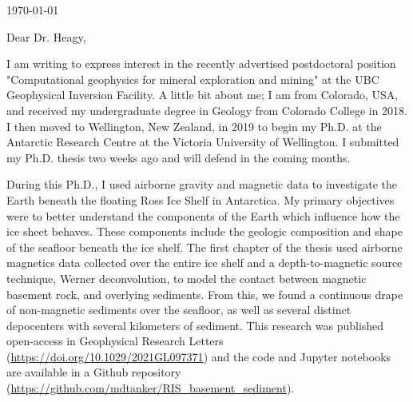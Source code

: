 \documentclass{ExpressiveCoverLetter}
\begin{document}
\coverletterheader[
    firstname=Matthew,
    middleinitial=D,
    lastname=Tankersley,
    email=matt.d.tankersley@gmail.com,
    linkedin=matthew-tankersley,
    github=mdtanker,
]

\vspace{0.25in}
\today
\vspace{0.15in}


Dear Dr. Heagy,

I am writing to express interest in the recently advertised postdoctoral
position "Computational geophysics for mineral exploration and mining" at the
UBC Geophysical Inversion Facility.
A little bit about me; I am from
Colorado, USA, and received my undergraduate degree in Geology from
Colorado College in 2018.
I then moved to Wellington, New Zealand, in
2019 to begin my Ph.D. at the Antarctic Research Centre at the Victoria
University of Wellington.
I submitted my Ph.D. thesis two weeks ago and will defend in the coming months.

During this Ph.D., I used airborne gravity and magnetic data to
investigate the Earth beneath the floating Ross Ice Shelf in Antarctica.
My primary objectives were to better understand the components of the
Earth which influence how the ice sheet behaves. These components
include the geologic composition and shape of
the seafloor beneath the ice shelf. The first chapter of the thesis used
airborne magnetics data collected over the entire ice shelf and a
depth-to-magnetic source technique, Werner deconvolution, to model the contact
between magnetic basement rock, and overlying sediments. From this, we
found a continuous drape of non-magnetic sediments over the seafloor, as
well as several distinct depocenters with several kilometers of
sediment. This research was published open-access in Geophysical Research
Letters (\url{https://doi.org/10.1029/2021GL097371}) and the code and
Jupyter notebooks are available in a Github repository (\url{https://github.com/mdtanker/RIS_basement_sediment}).
\end{document}
